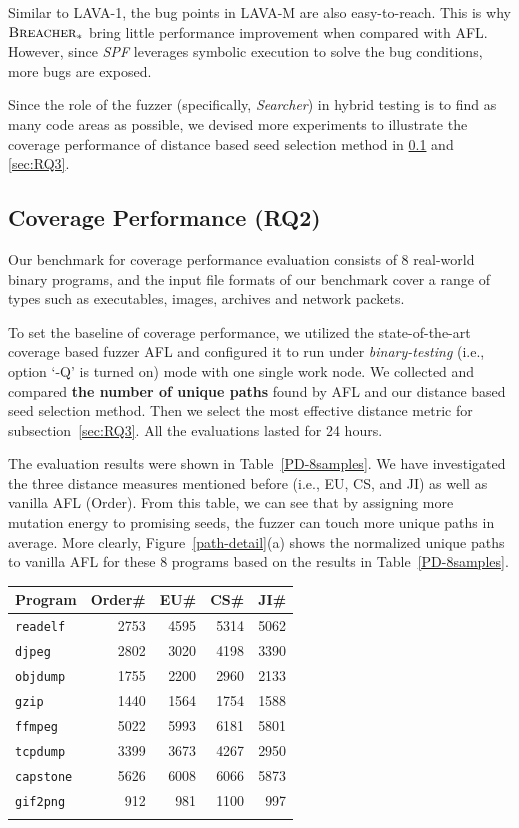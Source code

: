 \documentclass{cta-author}
\newcommand{\prototype}{\textsc{Breacher} }
\begin{document}
Similar to LAVA-1, the bug points in LAVA-M are also easy-to-reach. This is why
$\prototype_*$ bring little performance improvement when compared with AFL. However,
since \textit{SPF} leverages symbolic execution to solve the bug conditions, more
bugs are exposed.

Since the role of the fuzzer (specifically, \textit{Searcher}) in hybrid testing 
is to find as many code areas as possible,
we devised more experiments
to illustrate the coverage performance of distance based seed selection method
in \ref{sec:RQ2} and \ref{sec:RQ3}.

\subsection{Coverage Performance (RQ2)}\label{sec:RQ2}
Our benchmark for coverage performance evaluation consists of 8 real-world binary 
programs, and the input file formats of our benchmark cover a range of types such 
as executables, images, archives and network packets.

To set the baseline of coverage performance, we utilized the state-of-the-art 
coverage based fuzzer AFL \cite{online:afl} and configured it to run under 
\textit{binary-testing} (i.e., option `-Q' is turned on) mode with one 
single work node.
We collected and compared \textbf{the number of unique paths} found by 
AFL and our distance based seed selection method.
Then we select the most effective distance metric for 
subsection~\ref{sec:RQ3}.
All the evaluations lasted for 24 hours.

The evaluation results were shown in Table~\ref{PD-8samples}. We have 
investigated the three distance measures mentioned before (i.e., EU, CS, 
and JI) as well as vanilla AFL (Order).
From this table, we can see that by assigning more mutation energy to promising
seeds, the fuzzer can touch more unique paths in average.
More clearly, Figure~\ref{path-detail}(a) shows the normalized unique 
paths to vanilla AFL for these 8 programs 
based on the results in Table~\ref{PD-8samples}.
\begin{table}[!b]
{\begin{tabular*}{20pc}{@{\extracolsep{\fill}}lrrrr@{}}\toprule
		Program  & Order\# & EU\# & CS\# & JI\# \\
		\midrule
		\texttt{readelf}  &    2753 & 4595 & 5314 & 5062 \\
		\texttt{djpeg }  &    2802 & 3020 & 4198 & 3390 \\
		\texttt{objdump} &    1755 & 2200 & 2960 & 2133 \\
		\texttt{gzip }  &    1440 & 1564 & 1754 & 1588 \\
		\texttt{ffmpeg}  &    5022 & 5993 & 6181 & 5801 \\
		\texttt{tcpdump}  &    3399 & 3673 & 4267 & 2950 \\
		\texttt{capstone} &    5626 & 6008 & 6066 & 5873 \\
		\texttt{gif2png}  &     912 &  981 & 1100 &  997 \\ 
		\botrule
	\end{tabular*}}{}
\end{table}
\end{document}

